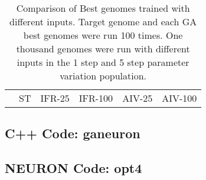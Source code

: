 \begin{table}[tp]
 \centering
 \caption{Comparison of Best genomes trained with different
   inputs.  Target genome and each GA best genomes were run 100
   times. One thousand genomes were run with different inputs in the 1
   step and 5 step parameter variation population.}\label{tab:GA:5}
 \begin{tabular}{p{1.0in}*{10}{c}}
\hline
                        & \multicolumn{2}{c}{ST}  & \multicolumn{2}{c}{IFR-25} & \multicolumn{2}{c}{IFR-100} & \multicolumn{2}{c}{AIV-25} & \multicolumn{2}{c}{AIV-100} \\
 \end{tabular}
 \end{table}


\subsection{C++ Code: \textsf{ganeuron}}

\subsection{NEURON Code: \textsf{opt4}}



\clearpage


